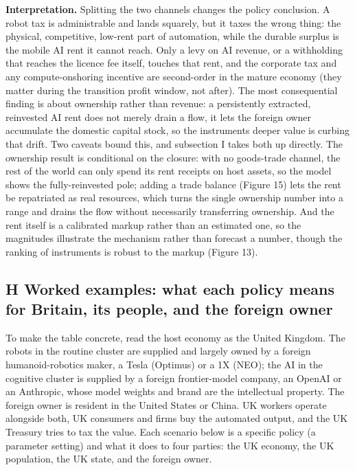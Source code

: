 \documentclass[12pt]{article}
\begin{document}
\textbf{Interpretation.} Splitting the two channels changes the policy
conclusion. A robot tax is administrable and lands squarely, but it
taxes the wrong thing: the physical, competitive, low-rent part of
automation, while the durable surplus is the mobile AI rent it cannot
reach. Only a levy on AI revenue, or a withholding that reaches the
licence fee itself, touches that rent, and the corporate tax and any
compute-onshoring incentive are second-order in the mature economy (they
matter during the transition profit window, not after). The most
consequential finding is about ownership rather than revenue: a
persistently extracted, reinvested AI rent does not merely drain a flow,
it lets the foreign owner accumulate the domestic capital stock, so the
instruments\textquotesingle{} deeper value is curbing that drift. Two
caveats bound this, and subsection I takes both up directly. The
ownership result is conditional on the closure: with no goods-trade
channel, the rest of the world can only spend its rent receipts on host
assets, so the model shows the fully-reinvested pole; adding a trade
balance (Figure 15) lets the rent be repatriated as real resources,
which turns the single ownership number into a range and drains the flow
without necessarily transferring ownership. And the rent itself is a
calibrated markup rather than an estimated one, so the magnitudes
illustrate the mechanism rather than forecast a number, though the
ranking of instruments is robust to the markup (Figure 13).

\hypertarget{h-worked-examples-what-each-policy-means-for-britain-its-people-and-the-foreign-owner}{%
\subsection{H \textperiodcentered{} Worked examples: what each policy means for Britain, its
people, and the foreign
owner}\label{h-worked-examples-what-each-policy-means-for-britain-its-people-and-the-foreign-owner}}

To make the table concrete, read the host economy as the United Kingdom.
The robots in the routine cluster are supplied and largely owned by a
foreign humanoid-robotics maker, a Tesla (Optimus) or a 1X (NEO); the AI
in the cognitive cluster is supplied by a foreign frontier-model
company, an OpenAI or an Anthropic, whose model weights and brand are
the intellectual property. The foreign owner is resident in the United
States or China. UK workers operate alongside both, UK consumers and
firms buy the automated output, and the UK Treasury tries to tax the
value. Each scenario below is a specific policy (a parameter setting)
and what it does to four parties: the UK economy, the UK population, the
UK state, and the foreign owner.
\end{document}
